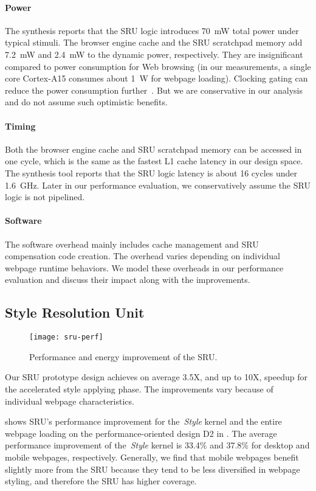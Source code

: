 \paragraph{Power} The synthesis reports that the SRU logic introduces 70~mW total power under typical stimuli. The browser engine cache and the SRU scratchpad memory add 7.2~mW and 2.4~mW to the dynamic power, respectively. They are insignificant compared to power consumption for Web browsing (in our measurements, a single core Cortex-A15 consumes about 1~W for webpage loading). Clocking gating can reduce the power consumption further~\cite{queuethermal}. But we are conservative in our analysis and do not assume such optimistic benefits.

\paragraph{Timing} Both the browser engine cache and SRU scratchpad memory can be accessed in one cycle, which is the same as the fastest L1 cache latency in our design space. The synthesis tool reports that the SRU logic latency is about 16 cycles under 1.6~GHz. Later in our performance evaluation, we conservatively assume the SRU logic is not pipelined.

\paragraph{Software} The software overhead mainly includes cache management and SRU compensation code creation. The overhead varies depending on individual webpage runtime behaviors. We model these overheads in our performance evaluation and discuss their impact along with the improvements.

\subsection{Style Resolution Unit}
\label{sec:arch:eval:sru}

\begin{figure}[t]
\centering
\texttt{[image: sru-perf]}
\caption{Performance and energy improvement of the SRU.}
\label{fig:sru-perf}
\end{figure}

Our SRU prototype design achieves on average 3.5X, and up to 10X, speedup for the accelerated style applying phase. The improvements vary because of individual webpage characteristics.

 shows SRU's performance improvement for the~\textit{Style} kernel and the entire webpage loading on the performance-oriented design D2 in .  The average performance improvement of the~\textit{Style} kernel is 33.4\% and 37.8\% for desktop and mobile webpages, respectively. Generally, we find that mobile webpages benefit slightly more from the SRU because they tend to be less diversified in webpage styling, and therefore the SRU has higher coverage.

